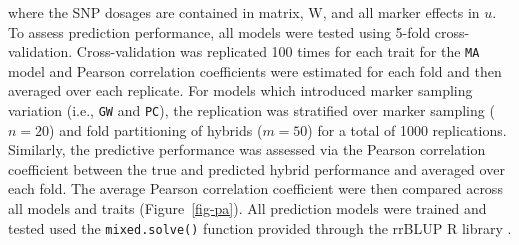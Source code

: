 where the SNP dosages are contained in matrix, \(\mathrm{W}\), and all
marker effects in \(u\). To assess prediction performance, all models
were tested using 5-fold cross-validation. Cross-validation was
replicated 100 times for each trait for the \texttt{MA} model and
Pearson correlation coefficients were estimated for each fold and then
averaged over each replicate. For models which introduced marker
sampling variation (i.e., \texttt{GW} and \texttt{PC}), the replication
was stratified over marker sampling (\(n = 20\)) and fold partitioning
of hybrids (\(m = 50\)) for a total of 1000 replications. Similarly,
the predictive performance was assessed via the Pearson correlation
coefficient between the true and predicted hybrid performance and
averaged over each fold. The average Pearson correlation coefficient
were then compared across all models and traits (Figure~\ref{fig-pa}).
All prediction models were trained and tested used the
\texttt{mixed.solve()} function provided through the rrBLUP R library
\autocite{Endelman2011}.

